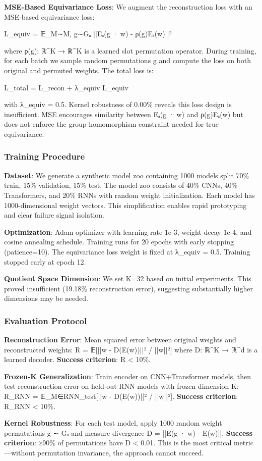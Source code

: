 \textbf{MSE-Based Equivariance Loss}: We augment the reconstruction loss with an MSE-based equivariance loss:

L_equiv = 𝔼_{M∼M, g∼Gₐ} ||Eₐ(g · w) - ρ(g)Eₐ(w)||²

where ρ(g): ℝ^K → ℝ^K is a learned slot permutation operator. During training, for each batch we sample random permutations g and compute the loss on both original and permuted weights. The total loss is:

L_total = L_recon + λ_equiv L_equiv

with λ_equiv = 0.5. Kernel robustness of 0.00\% reveals this loss design is insufficient. MSE encourages similarity between Eₐ(g · w) and ρ(g)Eₐ(w) but does not enforce the group homomorphism constraint needed for true equivariance.

\subsubsection{Training Procedure}

\textbf{Dataset}: We generate a synthetic model zoo containing 1000 models split 70\% train, 15\% validation, 15\% test. The model zoo consists of 40\% CNNs, 40\% Transformers, and 20\% RNNs with random weight initialization. Each model has 1000-dimensional weight vectors. This simplification enables rapid prototyping and clear failure signal isolation.

\textbf{Optimization}: Adam optimizer with learning rate 1e-3, weight decay 1e-4, and cosine annealing schedule. Training runs for 20 epochs with early stopping (patience=10). The equivariance loss weight is fixed at λ_equiv = 0.5. Training stopped early at epoch 12.

\textbf{Quotient Space Dimension}: We set K=32 based on initial experiments. This proved insufficient (19.18\% reconstruction error), suggesting substantially higher dimensions may be needed.

\subsubsection{Evaluation Protocol}

\textbf{Reconstruction Error}: Mean squared error between original weights and reconstructed weights: R = 𝔼[||w - D(E(w))||² / ||w||²] where D: ℝ^K → ℝ^d is a learned decoder. \textbf{Success criterion}: R < 10\%.

\textbf{Frozen-K Generalization}: Train encoder on CNN+Transformer models, then test reconstruction error on held-out RNN models with frozen dimension K: R_RNN = 𝔼_{M∈RNN_test}[||w - D(E(w))||² / ||w||²]. \textbf{Success criterion}: R_RNN < 10\%.

\textbf{Kernel Robustness}: For each test model, apply 1000 random weight permutations g ∼ Gₐ and measure divergence D = ||E(g · w) - E(w)||. \textbf{Success criterion}: ≥90\% of permutations have D < 0.01. This is the most critical metric—without permutation invariance, the approach cannot succeed.
